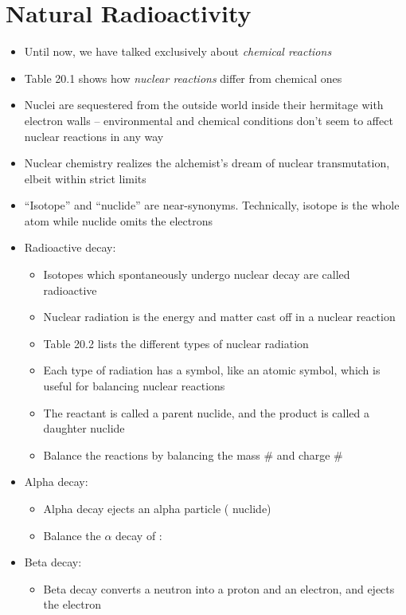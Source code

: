 \documentclass[12pt, openany, letterpaper]{memoir}
\begin{document}
\section{Natural Radioactivity}
\begin{itemize}
	\item Until now, we have talked exclusively about \emph{chemical reactions}
	\item Table 20.1 shows how \emph{nuclear reactions} differ from chemical ones
	\item Nuclei are sequestered from the outside world inside their hermitage with electron walls -- environmental and chemical conditions don't seem to affect nuclear reactions in any way
	\item Nuclear chemistry realizes the alchemist's dream of nuclear transmutation, elbeit within strict limits
	\item ``Isotope'' and ``nuclide'' are near-synonyms. Technically, isotope is the whole atom while nuclide omits the electrons
	\item Radioactive decay:
	\begin{itemize}
		\item Isotopes which spontaneously undergo nuclear decay are called radioactive
		\item Nuclear radiation is the energy and matter cast off in a nuclear reaction
		\item Table 20.2 lists the different types of nuclear radiation
		\item Each type of radiation has a symbol, like an atomic symbol, which is useful for balancing nuclear reactions
		\item The reactant is called a parent nuclide, and the product is called a daughter nuclide
		\item Balance the reactions by balancing the mass \# and charge \#
	\end{itemize}
	\item Alpha decay:
	\begin{itemize}
		\item Alpha decay ejects an alpha particle ( nuclide)
		\item Balance the $\alpha$ decay of : \hspace{1em} 
	\end{itemize}
	\item Beta decay:
	\begin{itemize}
		\item Beta decay converts a neutron into a proton and an electron, and ejects the electron

\end{itemize}
\end{itemize}
\end{document}
